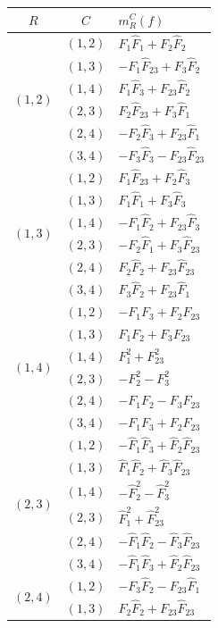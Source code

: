 \documentclass[11pt]{amsart}
\begin{document}
\begin{table}[h]
\centering
\begin{tabular}{c|c|l}
$R$ & $C$ & $m_R^C(f)$ \\
\hline\hline
\multirow{6}{*}{$(1,2)$}
& $(1,2)$ & $F_1 \hat F_1 + F_2 \hat F_2$ \\
& $(1,3)$ & $-F_1 \hat F_{23} + F_3 \hat F_2$ \\
& $(1,4)$ & $F_1 \hat F_3 + F_{23} \hat F_2$ \\
& $(2,3)$ & $F_2 \hat F_{23} + F_3 \hat F_1$ \\
& $(2,4)$ & $-F_2 \hat F_3 + F_{23} \hat F_1$ \\
& $(3,4)$ & $-F_3 \hat F_3 - F_{23} \hat F_{23}$ \\
\hline
\multirow{6}{*}{$(1,3)$}
& $(1,2)$ & $F_1 \hat F_{23} + F_2 \hat F_3$ \\
& $(1,3)$ & $F_1 \hat F_1 + F_3 \hat F_3$ \\
& $(1,4)$ & $-F_1 \hat F_2 + F_{23} \hat F_3$ \\
& $(2,3)$ & $-F_2 \hat F_1 + F_3 \hat F_{23}$ \\
& $(2,4)$ & $F_2 \hat F_2 + F_{23} \hat F_{23}$ \\
& $(3,4)$ & $F_3 \hat F_2 + F_{23} \hat F_1$ \\
\hline
\multirow{6}{*}{$(1,4)$}
& $(1,2)$ & $-F_1 F_3 + F_2 F_{23}$ \\
& $(1,3)$ & $F_1 F_2 + F_3 F_{23}$ \\
& $(1,4)$ & $F_1^2 + F_{23}^2$ \\
& $(2,3)$ & $-F_2^2 - F_3^2$ \\
& $(2,4)$ & $-F_1 F_2 - F_3 F_{23}$ \\
& $(3,4)$ & $-F_1 F_3 + F_2 F_{23}$ \\
\hline
\multirow{6}{*}{$(2,3)$}
& $(1,2)$ & $-\hat F_1 \hat F_3 + \hat F_2 \hat F_{23}$ \\
& $(1,3)$ & $\hat F_1 \hat F_2 + \hat F_3 \hat F_{23}$ \\
& $(1,4)$ & $-\hat F_2^2 - \hat F_3^2$ \\
& $(2,3)$ & $\hat F_1^2 + \hat F_{23}^2$ \\
& $(2,4)$ & $-\hat F_1 \hat F_2 - \hat F_3 \hat F_{23}$ \\
& $(3,4)$ & $-\hat F_1 \hat F_3 + \hat F_2 \hat F_{23}$ \\
\hline
\multirow{6}{*}{$(2,4)$}
& $(1,2)$ & $-F_3 \hat F_2 - F_{23} \hat F_1$ \\
& $(1,3)$ & $F_2 \hat F_2 + F_{23} \hat F_{23}$ \\

\end{tabular}
\end{table}
\end{document}

